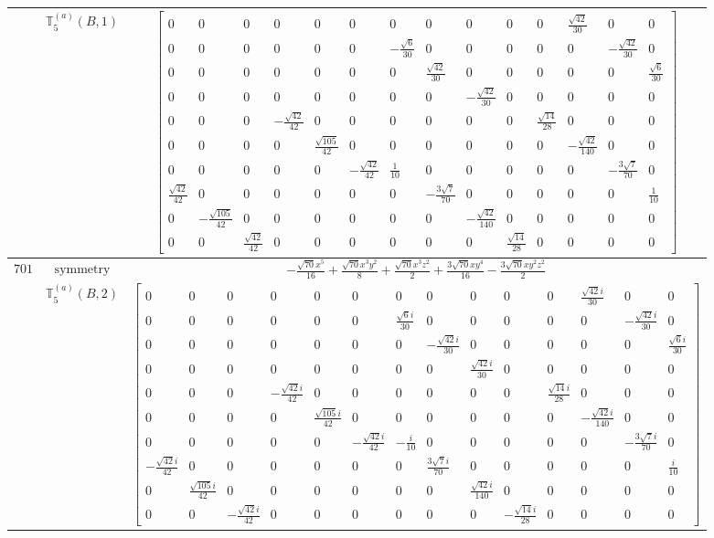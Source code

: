 \documentclass[fleqn,8pt,landscape]{jsarticle}
\begin{document}
\begin{longtable}{ccc}
$  $ & $ \mathbb{T}_{5}^{(a)}(B,1) $ & $ \begin{bmatrix} 0 & 0 & 0 & 0 & 0 & 0 & 0 & 0 & 0 & 0 & 0 & \frac{\sqrt{42}}{30} & 0 & 0 \\ 0 & 0 & 0 & 0 & 0 & 0 & - \frac{\sqrt{6}}{30} & 0 & 0 & 0 & 0 & 0 & - \frac{\sqrt{42}}{30} & 0 \\ 0 & 0 & 0 & 0 & 0 & 0 & 0 & \frac{\sqrt{42}}{30} & 0 & 0 & 0 & 0 & 0 & \frac{\sqrt{6}}{30} \\ 0 & 0 & 0 & 0 & 0 & 0 & 0 & 0 & - \frac{\sqrt{42}}{30} & 0 & 0 & 0 & 0 & 0 \\ 0 & 0 & 0 & - \frac{\sqrt{42}}{42} & 0 & 0 & 0 & 0 & 0 & 0 & \frac{\sqrt{14}}{28} & 0 & 0 & 0 \\ 0 & 0 & 0 & 0 & \frac{\sqrt{105}}{42} & 0 & 0 & 0 & 0 & 0 & 0 & - \frac{\sqrt{42}}{140} & 0 & 0 \\ 0 & 0 & 0 & 0 & 0 & - \frac{\sqrt{42}}{42} & \frac{1}{10} & 0 & 0 & 0 & 0 & 0 & - \frac{3 \sqrt{7}}{70} & 0 \\ \frac{\sqrt{42}}{42} & 0 & 0 & 0 & 0 & 0 & 0 & - \frac{3 \sqrt{7}}{70} & 0 & 0 & 0 & 0 & 0 & \frac{1}{10} \\ 0 & - \frac{\sqrt{105}}{42} & 0 & 0 & 0 & 0 & 0 & 0 & - \frac{\sqrt{42}}{140} & 0 & 0 & 0 & 0 & 0 \\ 0 & 0 & \frac{\sqrt{42}}{42} & 0 & 0 & 0 & 0 & 0 & 0 & \frac{\sqrt{14}}{28} & 0 & 0 & 0 & 0 \end{bmatrix} $ \\ \hline
$ 701 $ & $ \text{symmetry} $ & $ - \frac{\sqrt{70} x^{5}}{16} + \frac{\sqrt{70} x^{3} y^{2}}{8} + \frac{\sqrt{70} x^{3} z^{2}}{2} + \frac{3 \sqrt{70} x y^{4}}{16} - \frac{3 \sqrt{70} x y^{2} z^{2}}{2} $ \\
$  $ & $ \mathbb{T}_{5}^{(a)}(B,2) $ & $ \begin{bmatrix} 0 & 0 & 0 & 0 & 0 & 0 & 0 & 0 & 0 & 0 & 0 & \frac{\sqrt{42} i}{30} & 0 & 0 \\ 0 & 0 & 0 & 0 & 0 & 0 & \frac{\sqrt{6} i}{30} & 0 & 0 & 0 & 0 & 0 & - \frac{\sqrt{42} i}{30} & 0 \\ 0 & 0 & 0 & 0 & 0 & 0 & 0 & - \frac{\sqrt{42} i}{30} & 0 & 0 & 0 & 0 & 0 & \frac{\sqrt{6} i}{30} \\ 0 & 0 & 0 & 0 & 0 & 0 & 0 & 0 & \frac{\sqrt{42} i}{30} & 0 & 0 & 0 & 0 & 0 \\ 0 & 0 & 0 & - \frac{\sqrt{42} i}{42} & 0 & 0 & 0 & 0 & 0 & 0 & \frac{\sqrt{14} i}{28} & 0 & 0 & 0 \\ 0 & 0 & 0 & 0 & \frac{\sqrt{105} i}{42} & 0 & 0 & 0 & 0 & 0 & 0 & - \frac{\sqrt{42} i}{140} & 0 & 0 \\ 0 & 0 & 0 & 0 & 0 & - \frac{\sqrt{42} i}{42} & - \frac{i}{10} & 0 & 0 & 0 & 0 & 0 & - \frac{3 \sqrt{7} i}{70} & 0 \\ - \frac{\sqrt{42} i}{42} & 0 & 0 & 0 & 0 & 0 & 0 & \frac{3 \sqrt{7} i}{70} & 0 & 0 & 0 & 0 & 0 & \frac{i}{10} \\ 0 & \frac{\sqrt{105} i}{42} & 0 & 0 & 0 & 0 & 0 & 0 & \frac{\sqrt{42} i}{140} & 0 & 0 & 0 & 0 & 0 \\ 0 & 0 & - \frac{\sqrt{42} i}{42} & 0 & 0 & 0 & 0 & 0 & 0 & - \frac{\sqrt{14} i}{28} & 0 & 0 & 0 & 0 \end{bmatrix} $ \\ \hline

\end{longtable}
\end{document}
